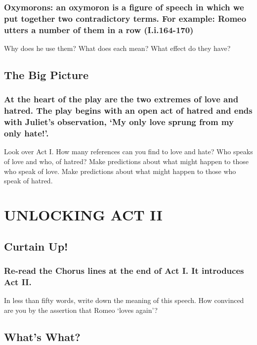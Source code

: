 \documentclass{article}
\begin{document}
\subsubsection{Oxymorons: an oxymoron is a figure of speech in which we put together two contradictory terms. For example: Romeo utters a number of them in a row (I.i.164-170)}
\begin{outline}
\1 Why does he use them?
\2 
\1 What does each mean?
\2 
\1 What effect do they have?
\2 
\end{outline}
\subsection{The Big Picture}
\subsubsection{At the heart of the play are the two extremes of love and hatred. The play begins with an open act of hatred and ends with Juliet's observation, `My only love sprung from my only hate!'.}
\begin{outline}
\1 Look over Act I. How many references can you find to love and hate?
\2 
\1 Who speaks of love and who, of hatred?
\2 
\1 Make predictions about what might happen to those who speak of love.
\2 
\1 Make predictions about what might happen to those who speak of hatred.
\2 
\end{outline}

\newpage

\section{UNLOCKING ACT II}
\subsection{Curtain Up!}
\subsubsection{Re-read the Chorus lines at the end of Act I. It introduces Act II.}
\begin{outline}
\1 In less than fifty words, write down the meaning of this speech.
\1 How convinced are you by the assertion that Romeo `loves again'?
\end{outline}
\subsection{What's What?}
\end{document}
